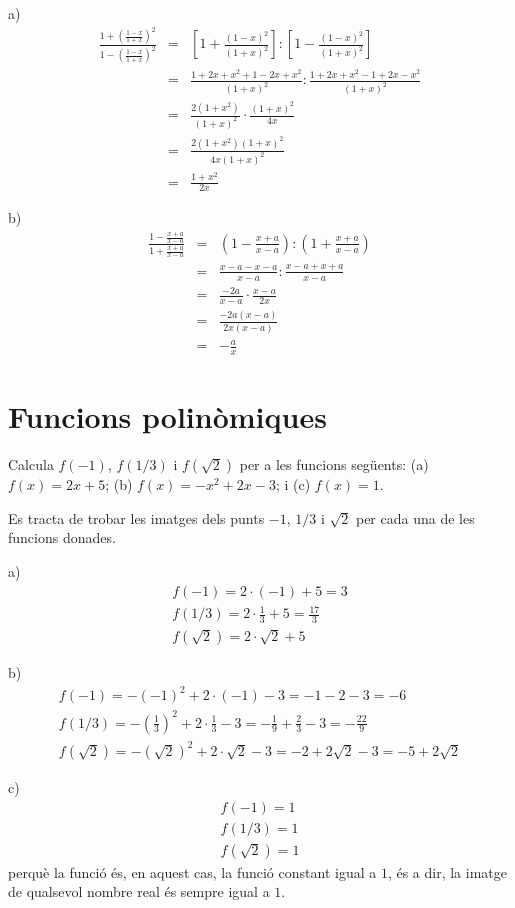 \begin{solucio}
a)\begin{eqnarray*}
\frac{1+\left( \frac{1-x}{1+x}\right) ^{2}}{1-\left( \frac{1-x}{1+x}\right)
^{2}} &=&\left[ 1+\frac{(1-x)^{2}}{(1+x)^{2}}\right]:\left[ 1-\frac{(1-x)^{2}}{(1+x)^{2}}\right] \\
&=&\frac{1+2x+x^{2}+1-2x+x^{2}}{(1+x)^{2}}:\frac{1+2x+x^{2}-1+2x-x^{2}}{(1+x)^{2}} \\
&=&\frac{2(1+x^{2})}{(1+x)^{2}}\cdot \frac{(1+x)^{2}}{4x} \\
&=&\frac{2(1+x^{2})(1+x)^{2}}{4x(1+x)^{2}} \\
&=&\frac{1+x^{2}}{2x}
\end{eqnarray*}

b)\begin{eqnarray*}
\frac{1-\frac{x+a}{x-a}}{1+\frac{x+a}{x-a}} &=&\left( 1-\frac{x+a}{x-a}\right):\left( 1+\frac{x+a}{x-a}\right) \\
&=&\frac{x-a-x-a}{x-a}:\frac{x-a+x+a}{x-a} \\
&=&\frac{-2a}{x-a}\cdot \frac{x-a}{2x} \\
&=&\frac{-2a(x-a)}{2x(x-a)} \\
&=&-\frac{a}{x}
\end{eqnarray*}
\end{solucio}

\section{Funcions polinòmiques}

\begin{exercici}
Calcula $f(-1)$, $f(1/3)$ i $f(\sqrt{2})$ per a les funcions següents: (a)
$f(x)=2x+5$; (b) $f(x)=-x^{2}+2x-3$; i (c) $f(x)=1$.
\end{exercici}

\begin{solucio}
Es tracta de trobar les imatges dels punts $-1$, $1/3$ i $\sqrt{2}$
per cada una de les funcions donades.

a)\[
\begin{array}{l}
f(-1)=2\cdot (-1)+5=3 \\
f(1/3)=2\cdot \frac{1}{3}+5=\frac{17}{3} \\
f(\sqrt{2})=2\cdot \sqrt{2}+5\end{array}\]

b)\[
\begin{array}{l}
f(-1)=-(-1)^{2}+2\cdot (-1)-3=-1-2-3=-6 \\
f(1/3)=-\left( \frac{1}{3}\right) ^{2}+2\cdot \frac{1}{3}-3=-\frac{1}{9}+\frac{2}{3}-3=-\frac{22}{9} \\
f(\sqrt{2})=-\left( \sqrt{2}\right) ^{2}+2\cdot \sqrt{2}-3=-2+2\sqrt{2}-3=-5+2\sqrt{2}\end{array}\]

c)\[
\begin{array}{l}
f(-1)=1 \\
f(1/3)=1 \\
f(\sqrt{2})=1\end{array}\]perquè la funció és, en aquest cas, la funció constant igual a $1$,
és a dir, la imatge de qualsevol nombre real és sempre igual a $1$.
\end{solucio}

